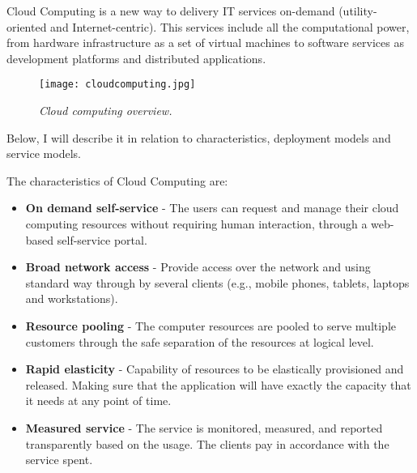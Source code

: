 Cloud Computing is a new way to delivery IT services on-demand (utility-oriented and Internet-centric). This services include all the computational power, from hardware infrastructure as a set of virtual machines to software services as development platforms and distributed applications.

\begin{figure}[!ht]
\begin{center}
\texttt{[image: cloudcomputing.jpg]}
\caption{\small \sl Cloud computing overview.\label{fig:cloudcomputing}}
\end{center}
\end{figure}

Below, I will describe it in relation to characteristics, deployment models and service models\cite{schouten2013ibm}.

The characteristics of Cloud Computing are:
\begin{itemize}
	\item \textbf{On demand self-service} 	- The users can request and manage their cloud computing resources without requiring human interaction, through a web-based self-service portal.
	\item \textbf{Broad network access 	}	- Provide access over the network and using standard way through by several clients (e.g., mobile phones, tablets, laptops and workstations).
	\item \textbf{Resource pooling 		}	- The computer resources are pooled to serve multiple customers through the safe separation of the resources at logical level.
	\item \textbf{Rapid elasticity 		}	- Capability of resources to be elastically provisioned and released. Making sure that the application will have exactly the capacity that it needs at any point of time.
	\item \textbf{Measured service 		}	- The service is monitored, measured, and reported transparently based on the usage. The clients pay in accordance with the service spent.
\end{itemize}

